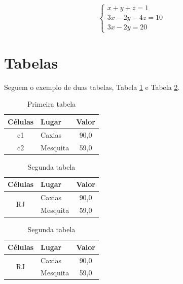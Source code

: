  \begin{equation} \label{eq:tmp81}
  \begin{cases}
    x+y +z= 1 \\
    3x-2y -4z= 10 \\
    3x-2y = 20
  \end{cases}
 \end{equation}


\section{Tabelas}
\label{sec:Tabelas}

Seguem o exemplo de duas tabelas, Tabela \ref{tab:Primeira-tabela} e Tabela \ref{tab:Segunda-tabela}.

\begin{table}[ht]
	\centering
	\caption{Primeira tabela}
	\label{tab:Primeira-tabela}
	\begin{tabular}{ clc } 
	\hline
	Células 	& Lugar    & Valor \\ 
	\hline
	c1   			& Caxias   & 90,0 \\ 
	c2 				& Mesquita & 59,0 \\ 
	\hline
	\end{tabular}
\end{table}

\begin{table}[ht]
	\centering
	\caption{Segunda tabela}
	\label{tab:Segunda-tabela}
	\begin{tabular}{ clc } 
	\hline
	Células 	& Lugar    & Valor \\ 
	\hline
	\multirow{2}{1cm}{\centering RJ} 
	    			& Caxias   & 90,0 \\ 
	   				& Mesquita & 59,0 \\ 
	\hline
	\end{tabular}
\end{table}

\begin{table}[ht]
	\centering
	\caption{Segunda tabela}
	\begin{tabular}{ clc } 
	\hline
	Células 	& Lugar    & Valor \\ 
	\hline
	\multirow{2}{1cm}{\centering RJ} 
	    			& Caxias   & 90,0 \\ 
	   				& Mesquita & 59,0 \\ 
	\hline
	\end{tabular}
\end{table}

